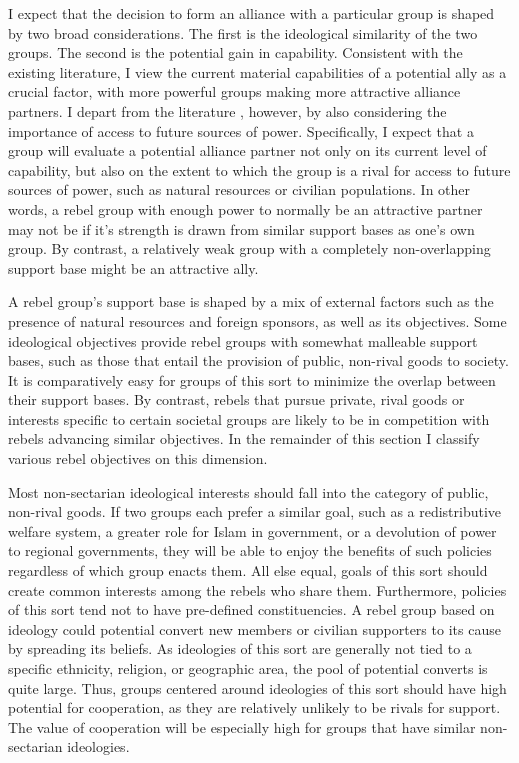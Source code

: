 \documentclass[12pt,]{book}
\begin{document}
I expect that the decision to form an alliance with a particular group
is shaped by two broad considerations. The first is the ideological
similarity of the two groups. The second is the potential gain in
capability. Consistent with the existing literature, I view the current
material capabilities of a potential ally as a crucial factor, with more
powerful groups making more attractive alliance partners. I depart from
the literature \citep[e.g.][]{Christia2012}, however, by also
considering the importance of access to future sources of power.
Specifically, I expect that a group will evaluate a potential alliance
partner not only on its current level of capability, but also on the
extent to which the group is a rival for access to future sources of
power, such as natural resources or civilian populations. In other
words, a rebel group with enough power to normally be an attractive
partner may not be if it's strength is drawn from similar support bases
as one's own group. By contrast, a relatively weak group with a
completely non-overlapping support base might be an attractive ally.

A rebel group's support base is shaped by a mix of external factors such
as the presence of natural resources and foreign sponsors, as well as
its objectives. Some ideological objectives provide rebel groups with
somewhat malleable support bases, such as those that entail the
provision of public, non-rival goods to society. It is comparatively
easy for groups of this sort to minimize the overlap between their
support bases. By contrast, rebels that pursue private, rival goods or
interests specific to certain societal groups are likely to be in
competition with rebels advancing similar objectives. In the remainder
of this section I classify various rebel objectives on this dimension.

Most non-sectarian ideological interests should fall into the category
of public, non-rival goods. If two groups each prefer a similar goal,
such as a redistributive welfare system, a greater role for Islam in
government, or a devolution of power to regional governments, they will
be able to enjoy the benefits of such policies regardless of which group
enacts them. All else equal, goals of this sort should create common
interests among the rebels who share them. Furthermore, policies of this
sort tend not to have pre-defined constituencies. A rebel group based on
ideology could potential convert new members or civilian supporters to
its cause by spreading its beliefs. As ideologies of this sort are
generally not tied to a specific ethnicity, religion, or geographic
area, the pool of potential converts is quite large. Thus, groups
centered around ideologies of this sort should have high potential for
cooperation, as they are relatively unlikely to be rivals for support.
The value of cooperation will be especially high for groups that have
similar non-sectarian ideologies.
\end{document}
